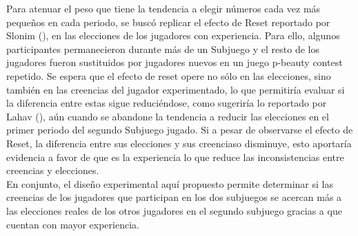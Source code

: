 Para atenuar el peso que tiene la tendencia a elegir números cada vez más pequeños en cada periodo, se buscó replicar el efecto de Reset reportado por Slonim (\citeyear{Slonim}), en las elecciones de los jugadores con experiencia. Para ello, algunos participantes permanecieron durante más de un Subjuego y el resto de los jugadores fueron sustituidos por jugadores nuevos en un juego p-beauty contest repetido. Se espera que el efecto de reset opere no sólo en las elecciones, sino también en las creencias del jugador experimentado, lo que permitiría evaluar si la diferencia entre estas sigue reduciéndose, como sugeriría lo reportado por Lahav (\citeyear{Lahav}), aún cuando se abandone la tendencia a reducir las elecciones en el primer periodo del segundo Subjuego jugado. Si a pesar de observarse el efecto de Reset, la diferencia entre sus elecciones y sus creenciaso disminuye, esto aportaría evidencia a favor de que es la experiencia lo que reduce las inconsistencias entre creencias y elecciones.\\

En conjunto, el diseño experimental aquí propuesto permite determinar si las creencias de los jugadores que participan en los dos subjuegos se acercan más a las elecciones reales de los otros jugadores en el segundo subjuego gracias a que cuentan con mayor experiencia.\\

